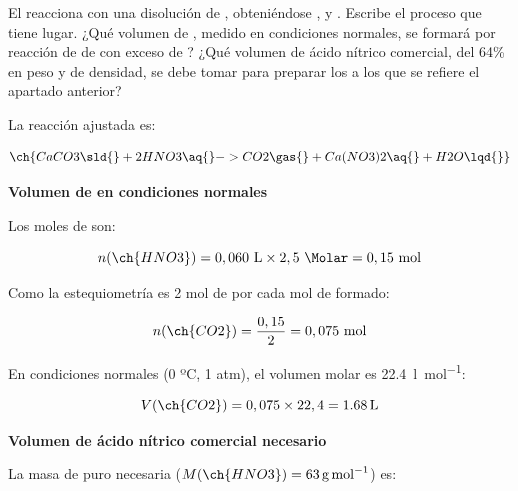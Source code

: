 \begin{exercise}
    El  reacciona con una disolución de , obteniéndose ,  y . Escribe el proceso que tiene lugar. ¿Qué volumen de , medido en condiciones normales, se formará por reacción de  de   con exceso de ? ¿Qué volumen de ácido nítrico comercial, del 64\% en peso y   de densidad, se debe tomar para preparar los   a los que se refiere el apartado anterior?
    \begin{solu}

        La reacción ajustada es:

        \begin{equation*}
            \ch{CaCO3 \sld{} + 2 HNO3 \aq{} -> CO2 \gas{} + Ca(NO3)2 \aq{} + H2O \lqd{}}
        \end{equation*}

        \textbf{Volumen de  en condiciones normales}

        Los moles de  son:

        \begin{equation*}
            n(\ch{HNO3}) = 0,060 \ \si{\litre} \times 2,5 \ \si{\Molar} = 0,15 \ \text{mol}
        \end{equation*}

        Como la estequiometría es 2 mol de  por cada mol de  formado:

        \begin{equation*}
            n(\ch{CO2}) = \dfrac{0,15}{2} = 0,075 \ \text{mol}
        \end{equation*}

        En condiciones normales (0 ºC, 1 atm), el volumen molar es \SI{22.4}{\litre\per\mole}:

        \begin{equation*}
            V(\ch{CO2}) = 0,075 \times 22,4 = \SI{1.68}{\litre}
        \end{equation*}

        \textbf{Volumen de ácido nítrico comercial necesario}

        La masa de  puro necesaria (\(M(\ch{HNO3}) = \SI{63}{\gram\per\mole}\)) es:


\end{solu}
\end{exercise}
